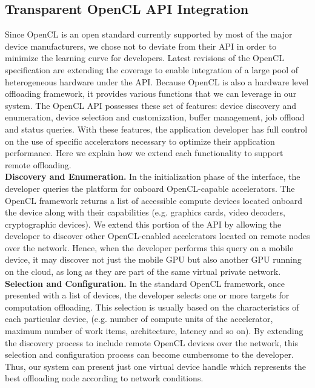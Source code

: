 \documentclass[10pt, conference, compsocconf]{IEEEtran}
\begin{document}
\subsection{Transparent OpenCL API Integration}
%
Since OpenCL is an open standard currently supported by most of the major 
device manufacturers, we chose not to deviate from their API in order to 
minimize the learning curve for developers. 
%
Latest revisions of the OpenCL specification are extending the coverage to 
enable integration of a large pool of heterogeneous hardware under the API.
%
Because OpenCL is also a hardware level offloading framework, it provides 
various functions that we can leverage in our system.
%
The OpenCL API possesses these set of features: device discovery and 
enumeration, device selection and customization, buffer management, job 
offload and status queries.
%
With these features, the application developer has full control on the 
use of specific accelerators necessary to optimize their application 
performance.
%
Here we explain how we extend each functionality to support remote
offloading.\\
%
\indent\textbf{Discovery and Enumeration.}
In the initialization phase of the interface, the developer queries the 
platform for onboard OpenCL-capable accelerators.
%
The OpenCL framework returns a list of accessible compute devices located 
onboard the device along with their capabilities (e.g. graphics cards, video 
decoders, cryptographic devices).
%
We extend this portion of the API by allowing the developer to discover other 
OpenCL-enabled accelerators located on remote nodes over the network. 
%
Hence, when the developer performs this query on a mobile device, it may 
discover not just the mobile GPU but also another GPU running on the cloud,
as long as they are part of the same virtual private network.\\
%
\indent\textbf{Selection and Configuration.}
In the standard OpenCL framework, once presented with a list of devices, the 
developer selects one or more targets for computation offloading.
%
This selection is usually based on the characteristics of each particular 
device, (e.g. number of compute units of the accelerator, maximum number of 
work items, architecture, latency and so on).
%
By extending the discovery process to include remote OpenCL devices over 
the network, this selection and configuration process can become cumbersome 
to the developer.
%
Thus, our system can present just one virtual device handle which represents
the best offloading node according to network conditions.
\end{document}
